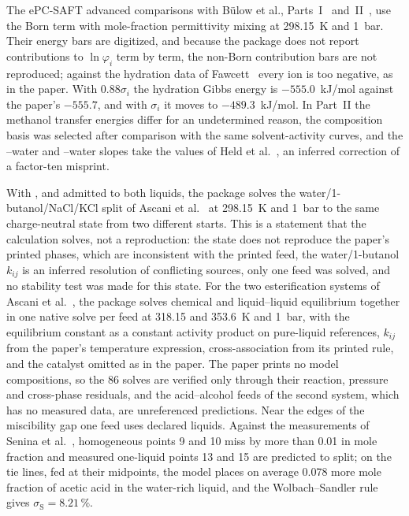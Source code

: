 The ePC-SAFT advanced comparisons with B\"ulow et al., Parts~I~\citep{Bulow2020,Bulow2021b} and~II~\citep{Bulow2021,Bulow2021c}, use the Born term with mole-fraction permittivity mixing at 298.15~K and 1~bar.
Their energy bars are digitized, and because the package does not report contributions to $\ln\varphi_i$ term by term, the non-Born contribution bars are not reproduced; against the hydration data of Fawcett~\citep{Fawcett1999} every ion is too negative, as in the paper.
With $0.88\sigma_i$ the  hydration Gibbs energy is $-555.0$~kJ/mol against the paper's $-555.7$, and with $\sigma_i$ it moves to $-489.3$~kJ/mol.
In Part~II the methanol transfer energies differ for an undetermined reason, the composition basis was selected after comparison with the same solvent-activity curves, and the --water and --water slopes take the values of Held et al.~\citep{Held2014}, an inferred correction of a factor-ten misprint.

With ,  and  admitted to both liquids, the package solves the water/1-butanol/NaCl/KCl split of Ascani et al.~\citep{Ascani2022} at 298.15~K and 1~bar to the same charge-neutral state from two different starts.
This is a statement that the calculation solves, not a reproduction: the state does not reproduce the paper's printed phases, which are inconsistent with the printed feed, the water/1-butanol $k_{ij}$ is an inferred resolution of conflicting sources, only one feed was solved, and no stability test was made for this state.
For the two esterification systems of Ascani et al.~\citep{Ascani2023}, the package solves chemical and liquid--liquid equilibrium together in one native solve per feed at 318.15 and 353.6~K and 1~bar, with the equilibrium constant as a constant activity product on pure-liquid references, $k_{ij}$ from the paper's temperature expression, cross-association from its printed rule, and the catalyst omitted as in the paper.
The paper prints no model compositions, so the 86 solves are verified only through their reaction, pressure and cross-phase residuals, and the acid--alcohol feeds of the second system, which has no measured data, are unreferenced predictions.
Near the edges of the miscibility gap one feed uses declared liquids.
Against the measurements of Senina et al.~\citep{Senina2022}, homogeneous points 9 and 10 miss by more than 0.01 in mole fraction and measured one-liquid points 13 and 15 are predicted to split; on the tie lines, fed at their midpoints, the model places on average 0.078 more mole fraction of acetic acid in the water-rich liquid, and the Wolbach--Sandler rule gives $\sigma_{\mathrm{S}}=8.21\,\%$.

